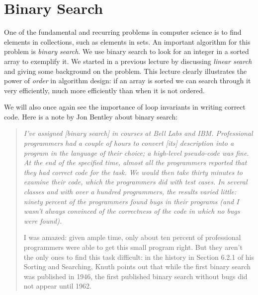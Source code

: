 \chapter{Binary Search}
\label{ch:binsearch}

\newcommand{\lecnum}{6}
\newcommand{\lecturer}{Frank Pfenning}

\maketitle

\begin{preamble}
\noindent
One of the fundamental and recurring problems in computer science is
to find elements in collections, such as elements in sets.  An
important algorithm for this problem is \emph{binary search}.  We use
binary search to look for an integer in a sorted array to exemplify
it.  We started in a previous lecture by discussing \emph{linear
  search} and giving some background on the problem.  This lecture
clearly illustrates the power of \emph{order} in algorithm design: if
an array is sorted we can search through it very efficiently, much
more efficiently than when it is not ordered.

We will also once again see the importance of loop invariants in
writing correct code.  Here is a note by Jon Bentley about binary
search:
\begin{quote}\em
  I've assigned [binary search] in courses at Bell Labs and IBM.
  Professional programmers had a couple of hours to convert [its]
  description into a program in the language of their choice; a
  high-level pseudo-code was fine.  At the end of the specified time,
  almost all the programmers reported that they had correct code for
  the task.  We would then take thirty minutes to examine their code,
  which the programmers did with test cases.  In several classes and
  with over a hundred programmers, the results varied little: ninety
  percent of the programmers found bugs in their programs (and I
  wasn't always convinced of the correctness of the code in which no
  bugs were found).

  I was amazed: given ample time, only about ten percent of
  professional programmers were able to get this small program right.
  But they aren't the only ones to find this task difficult: in the
  history in Section 6.2.1 of his Sorting and Searching, Knuth points
  out that while the first binary search was published in 1946, the
  first published binary search without bugs did not appear until
  1962.


\end{quote}
\end{preamble}
